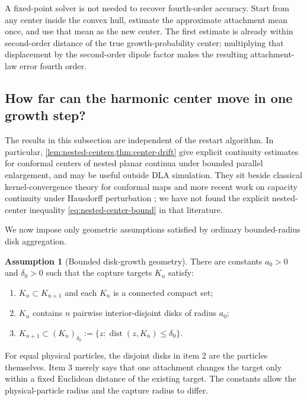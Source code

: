 \documentclass[11pt]{article}
\theoremstyle{mainthm}
\theoremstyle{definition}
\newtheorem{assumption}[assumption]{Assumption}
\theoremstyle{remark}
\begin{document}
\begin{plainbox}
A fixed-point solver is not needed to recover fourth-order accuracy. Start from any center inside the convex hull, estimate the approximate attachment mean once, and use that mean as the new center. The first estimate is already within second-order distance of the true growth-probability center; multiplying that displacement by the second-order dipole factor makes the resulting attachment-law error fourth order.
\end{plainbox}

\subsection{How far can the harmonic center move in one growth step?}
\label{sec:center-drift}

The results in this subsection are independent of the restart algorithm. In particular, \cref{lem:nested-centers,thm:center-drift} give explicit continuity estimates for conformal centers of nested planar continua under bounded parallel enlargement, and may be useful outside DLA simulation. They sit beside classical kernel-convergence theory for conformal maps and more recent work on capacity continuity under Hausdorff perturbation \cite{Pommerenke1992,KalmykovKovalev2022}; we have not found the explicit nested-center inequality \eqref{eq:nested-center-bound} in that literature.

We now impose only geometric assumptions satisfied by ordinary bounded-radius disk aggregation.

\begin{assumption}[Bounded disk-growth geometry]
\label{ass:disk-growth}
There are constants $a_0>0$ and $\delta_0>0$ such that the capture targets
$K_n$ satisfy:
\begin{enumerate}
  \item $K_n\subset K_{n+1}$ and each $K_n$ is a connected compact set;
  \item $K_n$ contains $n$ pairwise interior-disjoint disks of radius $a_0$;
  \item $K_{n+1}\subset (K_n)_{\delta_0}
  :=\{z:\operatorname{dist}(z,K_n)\le\delta_0\}$.
\end{enumerate}
\end{assumption}

For equal physical particles, the disjoint disks in item 2 are the particles themselves. Item 3 merely says that one attachment changes the target only within a fixed Euclidean distance of the existing target. The constants allow the physical-particle radius and the capture radius to differ.
\end{document}
